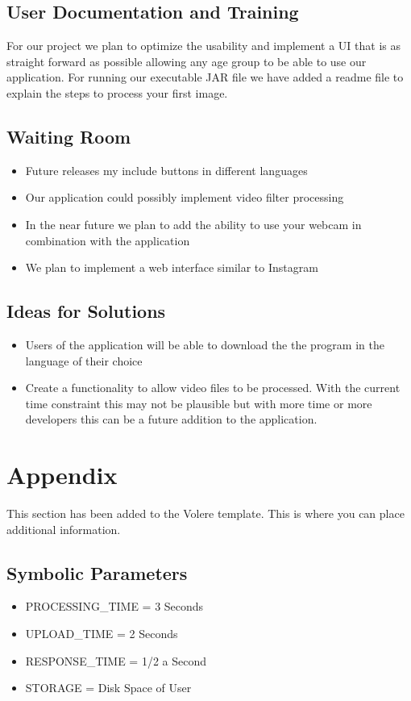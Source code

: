 \documentclass[12pt, titlepage]{article}
\begin{document}
\subsection{User Documentation and Training}

For our project we plan to optimize the usability and implement a UI that is as straight forward as possible allowing any age group to be able to use our application. For running our executable JAR file we have added a readme file to explain the steps to process your first image.

\subsection{Waiting Room}

\begin{itemize}	
\item Future releases my include buttons in different languages
\item Our application could possibly implement video filter processing
\item In the near future we plan to add the ability to use your webcam in combination with the application
\item We plan to implement a web interface similar to Instagram
\end{itemize}

\subsection{Ideas for Solutions}

\begin{itemize}
\item Users of the application will be able to download the the program in the language of their choice
\item Create a functionality to allow video files to be processed. With the current time constraint this may not be plausible but with more time or more developers this can be a future addition to the application.
\end{itemize}

\section{Appendix}

This section has been added to the Volere template.  This is where you can place
additional information.

\subsection{Symbolic Parameters}

\begin{itemize}
\item PROCESSING\_TIME = 3 Seconds
\item UPLOAD\_TIME = 2 Seconds
\item RESPONSE\_TIME = 1/2 a Second
\item STORAGE = Disk Space of User
\end{itemize}
\end{document}
